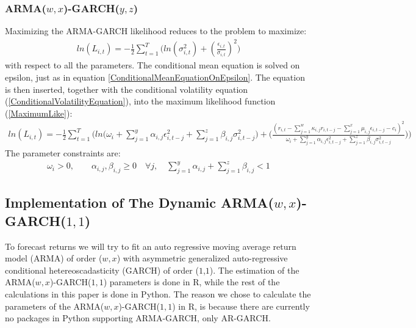 \subsubsection{ARMA($w,x$)-GARCH($y,z$)}
Maximizing the ARMA-GARCH likelihood reduces to the problem to maximize:
\begin{align} 
    ln(L_{i,t})=-\frac{1}{2}\sum_{t=1}^T\bigg( ln(\sigma_{i,t}^2)+(\frac{\epsilon_{i,t}}{\sigma_{i,t}})^2\bigg)   \label{MaximumLike}
\end{align}
with respect to all the parameters. The conditional mean equation is solved on epsilon, just as in equation \ref{ConditionalMeanEquationOnEpsilon}. The equation is then inserted, together with the conditional volatility equation (\ref{ConditionalVolatilityEquation}), into the maximum likelihood function (\ref{MaximumLike}):
\begin{align} 
    ln(L_{i,t})=-\frac{1}{2}\sum_{t=1}^T \Bigg(ln\Big(\omega_i + \sum_{j=1}^y\alpha_{i,j}\epsilon_{i,t-j}^2+\sum_{j=1}^z\beta_{i,j}\sigma_{i,t-j}^2\big)+\Big(\frac{(r_{i,t}-\sum_{j=1}^w\kappa_{i,j} r_{i,t-j}-\sum_{j=1}^x\mu_{i,j} \epsilon_{i,t-j}-c_i)^2}{\omega_i + \sum_{j=1}^y \alpha_{i,j} \epsilon_{i,t-j}^2 +\sum_{j=1}^z\beta_{i,j}\sigma_{i,t-j}^2}\Big)\Bigg)   \label{fullMaximumLike}
\end{align}
The parameter constraints are:
\begin{align} 
    \omega_i>0,\quad\quad \alpha_{i,j},\beta_{i,j}\geq0 \quad \forall j, \quad \sum_{j=1}^y\alpha_{i,j}+\sum_{j=1}^z\beta_{i,j}<1 \label{ParameterConstraints}
\end{align}

\subsection{Implementation of The Dynamic ARMA($w,x$)-GARCH($1,1$)}
To forecast returns we will try to fit an auto regressive moving average return model (ARMA) of order ($w,x$) with asymmetric generalized auto-regressive conditional hetereoscadasticity (GARCH) of order ($1$,$1$). The estimation of the ARMA($w,x$)-GARCH($1,1$) parameters is done in R, while the rest of the calculations in this paper is done in Python. The reason we chose to calculate the parameters of the ARMA($w,x$)-GARCH($1,1$) in R, is because there are currently no packages in Python supporting ARMA-GARCH, only AR-GARCH. 

